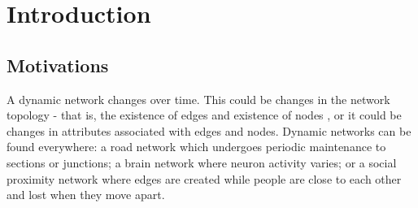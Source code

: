 
\chapter{Introduction}
\label{chap:introduction}
\ifpdf
    \graphicspath{{Introduction/Figures/PNG/}{Introduction/Figures/PDF/}{Introduction/Figures/}}
\else
    \graphicspath{{Introduction/Figures/EPS/}{Introduction/Figures/}}
\fi




\section{Motivations}
\label{motivations}
A dynamic network changes over time. This could be changes in the network topology - that is, the existence of edges and existence of nodes \cite{itdn}, or it could be changes in attributes associated with edges and nodes. Dynamic networks can be found everywhere: a road network which undergoes periodic maintenance to sections or junctions; a brain network where neuron activity varies; or a social proximity network where edges are created while people are close to each other and lost when they move apart.


